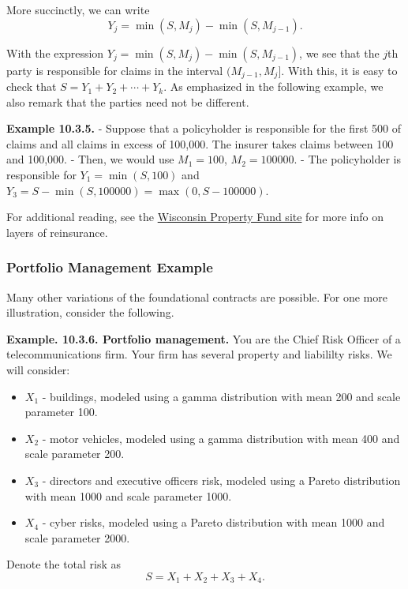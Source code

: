 \documentclass[]{book}
\providecommand{\tightlist}{%
  \setlength{\itemsep}{0pt}\setlength{\parskip}{0pt}}
\theoremstyle{definition}
\theoremstyle{definition}
\theoremstyle{definition}
\theoremstyle{remark}
\begin{document}
More succinctly, we can write \[Y_j = \min(S,M_j) - \min(S,M_{j-1}) .\]

With the expression \(Y_j = \min(S,M_j) - \min(S,M_{j-1})\), we see that
the \(j\)th party is responsible for claims in the interval
\((M_{j-1}, M_j].\) With this, it is easy to check that
\(S = Y_1 + Y_2 + \cdots + Y_k.\) As emphasized in the following
example, we also remark that the parties need not be different.

\textbf{Example 10.3.5.} - Suppose that a policyholder is responsible
for the first 500 of claims and all claims in excess of 100,000. The
insurer takes claims between 100 and 100,000. - Then, we would use
\(M_1 = 100\), \(M_2 =100000\). - The policyholder is responsible for
\(Y_1 =\min(S,100)\) and
\(Y_3 = S - \min(S,100000) = \max(0, S-100000)\).

For additional reading, see the
\href{https://sites.google.com/a/wisc.edu/local-government-property-insurance-fund/home/reinsurance}{Wisconsin
Property Fund site} for more info on layers of reinsurance.

\subsubsection{Portfolio Management
Example}\label{portfolio-management-example}

Many other variations of the foundational contracts are possible. For
one more illustration, consider the following.

\textbf{Example. 10.3.6. Portfolio management.} You are the Chief Risk
Officer of a telecommunications firm. Your firm has several property and
liabililty risks. We will consider:

\begin{itemize}
\tightlist
\item
  \(X_1\) - buildings, modeled using a gamma distribution with mean 200
  and scale parameter 100.
\item
  \(X_2\) - motor vehicles, modeled using a gamma distribution with mean
  400 and scale parameter 200.
\item
  \(X_3\) - directors and executive officers risk, modeled using a
  Pareto distribution with mean 1000 and scale parameter 1000.
\item
  \(X_4\) - cyber risks, modeled using a Pareto distribution with mean
  1000 and scale parameter 2000.
\end{itemize}

Denote the total risk as \[S = X_1 + X_2 + X_3 + X_4 .\]
\end{document}
